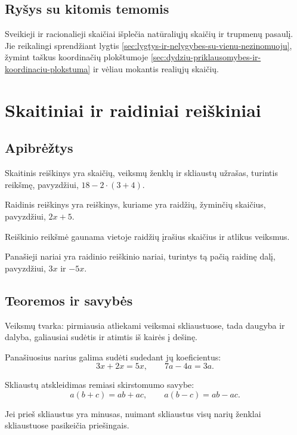 \subsection{Ryšys su kitomis temomis}
Sveikieji ir racionalieji skaičiai išplečia natūraliųjų skaičių ir trupmenų pasaulį. Jie reikalingi sprendžiant lygtis \ref{sec:lygtys-ir-nelygybes-su-vienu-nezinomuoju}, žymint taškus koordinačių plokštumoje \ref{sec:dydziu-priklausomybes-ir-koordinaciu-plokstuma} ir vėliau mokantis realiųjų skaičių.

\section{Skaitiniai ir raidiniai reiškiniai}\label{sec:skaitiniai-ir-raidiniai-reiskiniai}

\subsection{Apibrėžtys}
\begin{apibreztis}
Skaitinis reiškinys yra skaičių, veiksmų ženklų ir skliaustų užrašas, turintis reikšmę, pavyzdžiui, \(18-2\cdot(3+4)\).
\end{apibreztis}
\begin{apibreztis}
Raidinis reiškinys yra reiškinys, kuriame yra raidžių, žyminčių skaičius, pavyzdžiui, \(2x+5\).
\end{apibreztis}
\begin{apibreztis}
Reiškinio reikšmė gaunama vietoje raidžių įrašius skaičius ir atlikus veiksmus.
\end{apibreztis}
\begin{apibreztis}
Panašieji nariai yra raidinio reiškinio nariai, turintys tą pačią raidinę dalį, pavyzdžiui, \(3x\) ir \(-5x\).
\end{apibreztis}

\subsection{Teoremos ir savybės}
\begin{savybe}
Veiksmų tvarka: pirmiausia atliekami veiksmai skliaustuose, tada daugyba ir dalyba, galiausiai sudėtis ir atimtis iš kairės į dešinę.
\end{savybe}
\begin{savybe}
Panašiuosius narius galima sudėti sudedant jų koeficientus:
\[
3x+2x=5x,\qquad 7a-4a=3a.
\]
\end{savybe}
\begin{savybe}
Skliaustų atskleidimas remiasi skirstomumo savybe:
\[
a(b+c)=ab+ac,\qquad a(b-c)=ab-ac.
\]
\end{savybe}
\begin{savybe}
Jei prieš skliaustus yra minusas, nuimant skliaustus visų narių ženklai skliaustuose pasikeičia priešingais.
\end{savybe}

